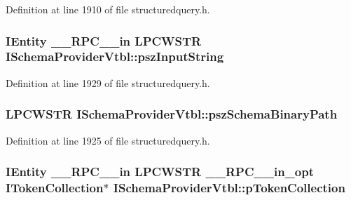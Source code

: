 Definition at line 1910 of file structuredquery.\+h.

\subsubsection[{\texorpdfstring{psz\+Input\+String}{pszInputString}}]{ {\bf I\+Entity} {\bf \+\_\+\+\_\+\+R\+P\+C\+\_\+\+\_\+in} {\bf L\+P\+C\+W\+S\+TR} I\+Schema\+Provider\+Vtbl\+::psz\+Input\+String}\hypertarget{struct_i_schema_provider_vtbl_a677536545e11c9aff0b82ffbd299839b}{}\label{struct_i_schema_provider_vtbl_a677536545e11c9aff0b82ffbd299839b}


Definition at line 1929 of file structuredquery.\+h.

\subsubsection[{\texorpdfstring{psz\+Schema\+Binary\+Path}{pszSchemaBinaryPath}}]{ {\bf L\+P\+C\+W\+S\+TR} I\+Schema\+Provider\+Vtbl\+::psz\+Schema\+Binary\+Path}\hypertarget{struct_i_schema_provider_vtbl_a54fc5ae186d44679bc84ead0c7690c79}{}\label{struct_i_schema_provider_vtbl_a54fc5ae186d44679bc84ead0c7690c79}


Definition at line 1925 of file structuredquery.\+h.

\subsubsection[{\texorpdfstring{p\+Token\+Collection}{pTokenCollection}}]{ {\bf I\+Entity} {\bf \+\_\+\+\_\+\+R\+P\+C\+\_\+\+\_\+in} {\bf L\+P\+C\+W\+S\+TR} {\bf \+\_\+\+\_\+\+R\+P\+C\+\_\+\+\_\+in\+\_\+opt} {\bf I\+Token\+Collection}$\ast$ I\+Schema\+Provider\+Vtbl\+::p\+Token\+Collection}\hypertarget{struct_i_schema_provider_vtbl_a18dd8d054d5568b43ef1f90b03e51725}{}\label{struct_i_schema_provider_vtbl_a18dd8d054d5568b43ef1f90b03e51725}


